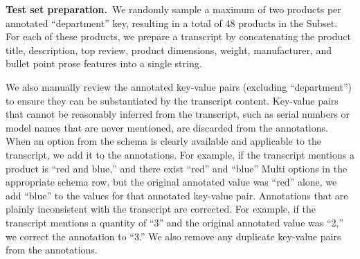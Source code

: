 \textbf{Test set preparation.}~We randomly sample a maximum of two products per annotated ``department'' key, resulting in a total of 48 products in the Subset. For each of these products, we prepare a transcript by concatenating the product title, description, top review, product dimensions, weight, manufacturer, and bullet point prose features into a single string. 

We also manually review the annotated key-value pairs (excluding ``department'') to ensure they can be substantiated by the transcript content. Key-value pairs that cannot be reasonably inferred from the transcript, such as serial numbers or model names that are never mentioned, are discarded from the annotations. When an option from the schema is clearly available and applicable to the transcript, we add it to the annotations. For example, if the transcript mentions a product is ``red and blue,'' and there exist ``red'' and ``blue'' Multi options in the appropriate schema row, but the original annotated value was ``red'' alone, we add ``blue'' to the values for that annotated key-value pair. Annotations that are plainly inconsistent with the transcript are corrected. For example, if the transcript mentions a quantity of ``3'' and the original annotated value was ``2,'' we correct the annotation to ``3.'' We also remove any duplicate key-value pairs from the annotations.

